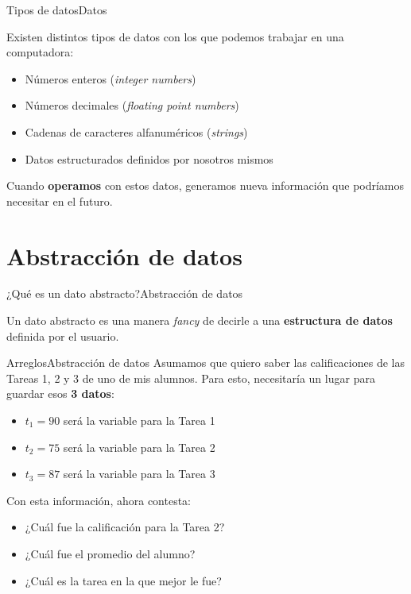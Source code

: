\documentclass[spanish, c]{beamer}
\begin{document}
\begin{frame}{Tipos de datos}{Datos}
    
    Existen distintos \alert{tipos de datos} con los que podemos trabajar en una computadora: \pause
 
     \bigskip
 
     \begin{itemize}[<+->]
         \item Números enteros (\textit{integer numbers})
         \item Números decimales (\textit{floating point numbers})
         \item Cadenas de caracteres alfanuméricos (\textit{strings})
         \item Datos estructurados definidos por nosotros mismos
     \end{itemize} \pause
 
     \bigskip
 
     Cuando \textbf{operamos} con estos datos, generamos nueva información que podríamos necesitar en el futuro.
 
 \end{frame}

\section{Abstracción de datos}

\begin{frame}{¿Qué es un dato abstracto?}{Abstracción de datos}
    \begin{center}
        \huge
     Un \alert{dato abstracto} es una manera \textit{fancy} de decirle a una \textbf{estructura de datos} definida por el usuario.
    \end{center}
\end{frame}

\begin{frame}{Arreglos}{Abstracción de datos}
    Asumamos que quiero saber las calificaciones de las Tareas 1, 2 y 3 de uno de mis alumnos.
    Para esto, necesitaría un lugar para guardar esos \textbf{3 datos}: \pause

    \bigskip

    \begin{itemize}[<+->]
        \item $t_1 = 90$ será la variable para la Tarea 1
        \item $t_2 = 75$ será la variable para la Tarea 2
        \item $t_3 = 87$ será la variable para la Tarea 3
    \end{itemize}

    \bigskip

    Con esta información, ahora contesta: \pause

    \begin{itemize}[<+->]
        \item ¿Cuál fue la calificación para la Tarea 2?
        \item ¿Cuál fue el promedio del alumno?
        \item ¿Cuál es la tarea en la que mejor le fue?
    \end{itemize}
\end{frame}
\end{document}
